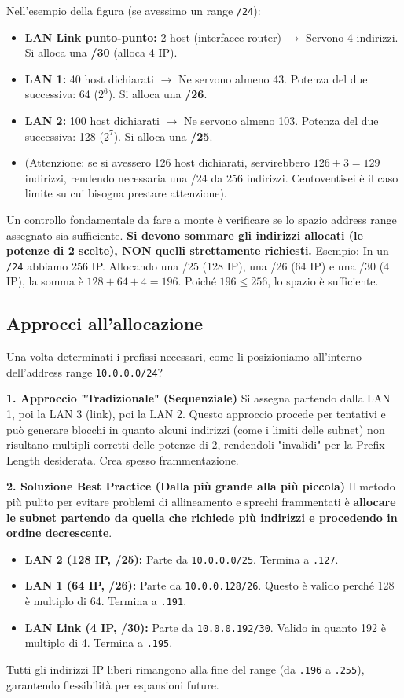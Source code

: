 Nell'esempio della figura (se avessimo un range \texttt{/24}):
\begin{itemize}
    \item \textbf{LAN Link punto-punto:} 2 host (interfacce router) $\rightarrow$ Servono 4 indirizzi. Si alloca una \textbf{/30} (alloca 4 IP).
    \item \textbf{LAN 1:} 40 host dichiarati $\rightarrow$ Ne servono almeno 43. Potenza del due successiva: 64 ($2^6$). Si alloca una \textbf{/26}.
    \item \textbf{LAN 2:} 100 host dichiarati $\rightarrow$ Ne servono almeno 103. Potenza del due successiva: 128 ($2^7$). Si alloca una \textbf{/25}.
    \item (Attenzione: se si avessero 126 host dichiarati, servirebbero $126+3=129$ indirizzi, rendendo necessaria una /24 da 256 indirizzi. Centoventisei è il caso limite su cui bisogna prestare attenzione).
\end{itemize}

Un controllo fondamentale da fare a monte è verificare se lo spazio address range assegnato sia sufficiente. \textbf{Si devono sommare gli indirizzi allocati (le potenze di 2 scelte), NON quelli strettamente richiesti.}
Esempio: In un \texttt{/24} abbiamo 256 IP. Allocando una /25 (128 IP), una /26 (64 IP) e una /30 (4 IP), la somma è $128 + 64 + 4 = 196$. Poiché $196 \le 256$, lo spazio è sufficiente.

\subsection{Approcci all'allocazione}
Una volta determinati i prefissi necessari, come li posizioniamo all'interno dell'address range \texttt{10.0.0.0/24}?

\textbf{1. Approccio "Tradizionale" (Sequenziale)}
Si assegna partendo dalla LAN 1, poi la LAN 3 (link), poi la LAN 2. Questo approccio procede per tentativi e può generare blocchi in quanto alcuni indirizzi (come i limiti delle subnet) non risultano multipli corretti delle potenze di 2, rendendoli "invalidi" per la Prefix Length desiderata. Crea spesso frammentazione.

\textbf{2. Soluzione Best Practice (Dalla più grande alla più piccola)}
Il metodo più pulito per evitare problemi di allineamento e sprechi frammentati è \textbf{allocare le subnet partendo da quella che richiede più indirizzi e procedendo in ordine decrescente}.
\begin{itemize}
    \item \textbf{LAN 2 (128 IP, /25):} Parte da \texttt{10.0.0.0/25}. Termina a \texttt{.127}.
    \item \textbf{LAN 1 (64 IP, /26):} Parte da \texttt{10.0.0.128/26}. Questo è valido perché 128 è multiplo di 64. Termina a \texttt{.191}.
    \item \textbf{LAN Link (4 IP, /30):} Parte da \texttt{10.0.0.192/30}. Valido in quanto 192 è multiplo di 4. Termina a \texttt{.195}.
\end{itemize}
Tutti gli indirizzi IP liberi rimangono alla fine del range (da \texttt{.196} a \texttt{.255}), garantendo flessibilità per espansioni future.

